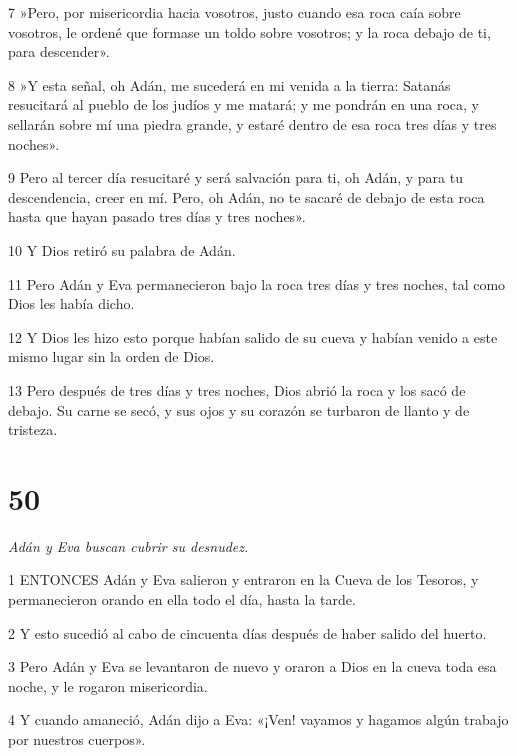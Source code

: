 \par 7 »Pero, por misericordia hacia vosotros, justo cuando esa roca caía sobre vosotros, le ordené que formase un toldo sobre vosotros; y la roca debajo de ti, para descender».

\par 8 »Y esta señal, oh Adán, me sucederá en mi venida a la tierra: Satanás resucitará al pueblo de los judíos y me matará; y me pondrán en una roca, y sellarán sobre mí una piedra grande, y estaré dentro de esa roca tres días y tres noches».

\par 9 Pero al tercer día resucitaré y será salvación para ti, oh Adán, y para tu descendencia, creer en mí. Pero, oh Adán, no te sacaré de debajo de esta roca hasta que hayan pasado tres días y tres noches».

\par 10 Y Dios retiró su palabra de Adán.

\par 11 Pero Adán y Eva permanecieron bajo la roca tres días y tres noches, tal como Dios les había dicho.

\par 12 Y Dios les hizo esto porque habían salido de su cueva y habían venido a este mismo lugar sin la orden de Dios.

\par 13 Pero después de tres días y tres noches, Dios abrió la roca y los sacó de debajo. Su carne se secó, y sus ojos y su corazón se turbaron de llanto y de tristeza.

\chapter{50}

\par \textit{Adán y Eva buscan cubrir su desnudez.}

\par 1 ENTONCES Adán y Eva salieron y entraron en la Cueva de los Tesoros, y permanecieron orando en ella todo el día, hasta la tarde.

\par 2 Y esto sucedió al cabo de cincuenta días después de haber salido del huerto.

\par 3 Pero Adán y Eva se levantaron de nuevo y oraron a Dios en la cueva toda esa noche, y le rogaron misericordia.

\par 4 Y cuando amaneció, Adán dijo a Eva: «¡Ven! vayamos y hagamos algún trabajo por nuestros cuerpos».

